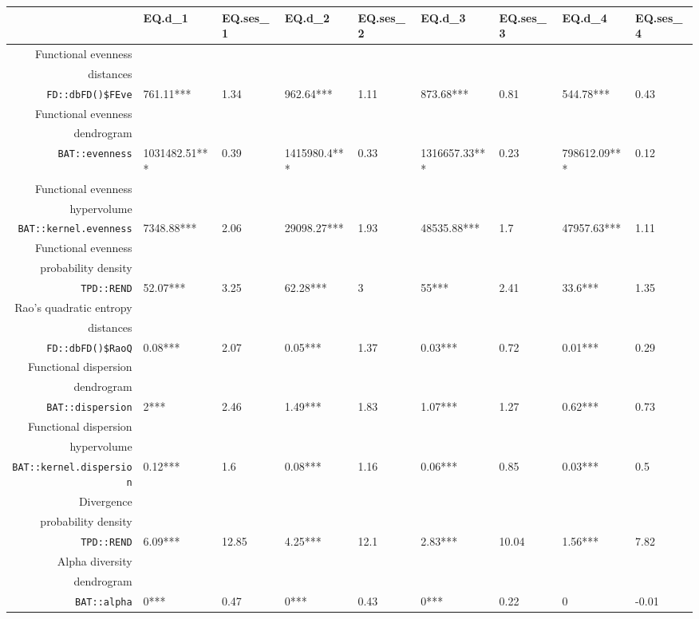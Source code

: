 \begin{table}[ht]
\scriptsize
\centering
\begin{tabular}{rllllllll}
  \hline
 & EQ.d\_1 & EQ.ses\_1 & EQ.d\_2 & EQ.ses\_2 & EQ.d\_3 & EQ.ses\_3 & EQ.d\_4 & EQ.ses\_4 \\ 
  \hline
Functional evenness\\distances\\\texttt{FD::dbFD()\$FEve} & 761.11*** & 1.34 & 962.64*** & 1.11 & 873.68*** & 0.81 & 544.78*** & 0.43 \\ 
  Functional evenness\\dendrogram\\\texttt{BAT::evenness} & 1031482.51*** & 0.39 & 1415980.4*** & 0.33 & 1316657.33*** & 0.23 & 798612.09*** & 0.12 \\ 
  Functional evenness\\hypervolume\\\texttt{BAT::kernel.evenness} & 7348.88*** & 2.06 & 29098.27*** & 1.93 & 48535.88*** & 1.7 & 47957.63*** & 1.11 \\ 
  Functional evenness\\probability density\\\texttt{TPD::REND} & 52.07*** & 3.25 & 62.28*** & 3 & 55*** & 2.41 & 33.6*** & 1.35 \\ 
  Rao's quadratic entropy\\distances\\\texttt{FD::dbFD()\$RaoQ} & 0.08*** & 2.07 & 0.05*** & 1.37 & 0.03*** & 0.72 & 0.01*** & 0.29 \\ 
  Functional dispersion\\dendrogram\\\texttt{BAT::dispersion} & 2*** & 2.46 & 1.49*** & 1.83 & 1.07*** & 1.27 & 0.62*** & 0.73 \\ 
  Functional dispersion\\hypervolume\\\texttt{BAT::kernel.dispersion} & 0.12*** & 1.6 & 0.08*** & 1.16 & 0.06*** & 0.85 & 0.03*** & 0.5 \\ 
  Divergence\\probability density\\\texttt{TPD::REND} & 6.09*** & 12.85 & 4.25*** & 12.1 & 2.83*** & 10.04 & 1.56*** & 7.82 \\ 
  Alpha diversity\\dendrogram\\\texttt{BAT::alpha} & 0*** & 0.47 & 0*** & 0.43 & 0*** & 0.22 & 0 & -0.01 \\ 

\end{tabular}
\end{table}
